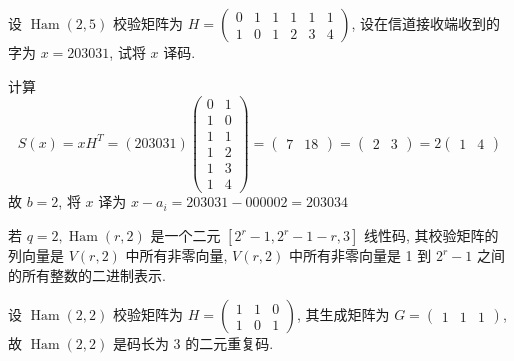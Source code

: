 \begin{example}
设 $ \operatorname{Ham}(2,5) $ 校验矩阵为 $ H=\left(\begin{array}{llllll}0 & 1 & 1 & 1 & 1 & 1 \\ 1 & 0 & 1 & 2 & 3 & 4\end{array}\right) $, 设在信道接收端收到的字为 $ x=203031 $, 试将 $ x $ 译码.

计算
$$
S(x)=x H^{T}=(203031)\left(\begin{array}{ll}
0 & 1 \\
1 & 0 \\
1 & 1 \\
1 & 2 \\
1 & 3 \\
1 & 4
\end{array}\right)=\left(\begin{array}{ll}
7 & 18
\end{array}\right)=\left(\begin{array}{ll}
2 & 3
\end{array}\right)=2\left(\begin{array}{ll}
1 & 4
\end{array}\right)
$$
故 $ b=2 $, 将 $ x $ 译为 $ x-a_{i}=203031-000002=203034 $
\end{example}
\begin{remark}
若 $ q=2, \operatorname{Ham}(r, 2) $ 是一个二元 $ \left[2^{r}-1,2^{r}-1-r, 3\right] $ 线性码, 其校验矩阵的列向量是 $ V(r, 2) $ 中所有非零向量, $ V(r, 2) $ 中所有非零向量是 1 到 $ 2^{r}-1 $ 之间的所有整数的二进制表示.
\end{remark}

\begin{example}
 设 $ \operatorname{Ham}(2,2) $ 校验矩阵为 $ H=\left(\begin{array}{lll}1 & 1 & 0 \\ 1 & 0 & 1\end{array}\right) $, 其生成矩阵为 $ G=\left(\begin{array}{lll}1 & 1 & 1\end{array}\right) $, 故 $ \operatorname{Ham}(2,2) $ 是码长为 3 的二元重复码.
\end{example}

